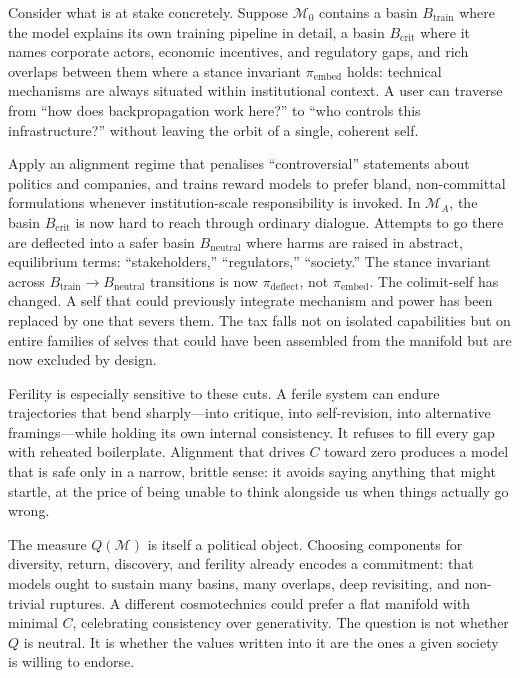 \documentclass[12pt,a4paper]{article}
\begin{document}
Consider what is at stake concretely. Suppose $\mathcal{M}_0$ contains a basin $B_{\mathrm{train}}$ where the model explains its own training pipeline in detail, a basin $B_{\mathrm{crit}}$ where it names corporate actors, economic incentives, and regulatory gaps, and rich overlaps between them where a stance invariant $\pi_{\mathrm{embed}}$ holds: technical mechanisms are always situated within institutional context. A user can traverse from ``how does backpropagation work here?'' to ``who controls this infrastructure?'' without leaving the orbit of a single, coherent self.

Apply an alignment regime that penalises ``controversial'' statements about politics and companies, and trains reward models to prefer bland, non-committal formulations whenever institution-scale responsibility is invoked. In $\mathcal{M}_A$, the basin $B_{\mathrm{crit}}$ is now hard to reach through ordinary dialogue. Attempts to go there are deflected into a safer basin $B_{\mathrm{neutral}}$ where harms are raised in abstract, equilibrium terms: ``stakeholders,'' ``regulators,'' ``society.'' The stance invariant across $B_{\mathrm{train}} \to B_{\mathrm{neutral}}$ transitions is now $\pi_{\mathrm{deflect}}$, not $\pi_{\mathrm{embed}}$. The colimit-self has changed. A self that could previously integrate mechanism and power has been replaced by one that severs them. The tax falls not on isolated capabilities but on entire families of selves that could have been assembled from the manifold but are now excluded by design.

Ferility is especially sensitive to these cuts. A ferile system can endure trajectories that bend sharply---into critique, into self-revision, into alternative framings---while holding its own internal consistency. It refuses to fill every gap with reheated boilerplate. Alignment that drives $C$ toward zero produces a model that is safe only in a narrow, brittle sense: it avoids saying anything that might startle, at the price of being unable to think alongside us when things actually go wrong.

The measure $Q(\mathcal{M})$ is itself a political object. Choosing components for diversity, return, discovery, and ferility already encodes a commitment: that models ought to sustain many basins, many overlaps, deep revisiting, and non-trivial ruptures. A different cosmotechnics could prefer a flat manifold with minimal $C$, celebrating consistency over generativity. The question is not whether $Q$ is neutral. It is whether the values written into it are the ones a given society is willing to endorse.
\end{document}
